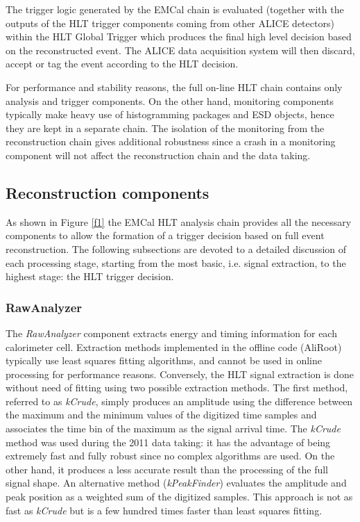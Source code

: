 The trigger logic generated by the EMCal chain is evaluated 
(together with the outputs of the HLT trigger components coming from other ALICE detectors)
within the HLT Global Trigger which produces the final high level decision based on the reconstructed event.
The ALICE data acquisition system will then discard, accept or tag the event according to the HLT decision.

For performance and stability reasons, the full on-line HLT chain contains only analysis 
and trigger components. On the other hand, monitoring components typically make 
heavy use of histogramming packages and ESD objects, hence they are kept in a separate chain.
The isolation of the monitoring from the reconstruction chain gives additional robustness since 
a crash in a monitoring component will not affect the reconstruction chain and the data taking.

\subsection{Reconstruction components}

As shown in Figure \ref{f1} the EMCal HLT analysis chain provides all the 
necessary components to allow the formation of a trigger
decision based on full event reconstruction. The following 
subsections are devoted to a detailed discussion of each processing 
stage, starting from the most basic, i.e. signal extraction, to 
the highest stage: the HLT trigger decision.

\subsubsection{RawAnalyzer}
The {\it RawAnalyzer} component extracts energy and timing information for each calorimeter cell. 
Extraction methods implemented in the offline code (AliRoot) typically 
use least squares fitting algorithms, and cannot be used in online processing for 
performance reasons. 
Conversely, the HLT signal extraction is done without need of fitting 
using two possible extraction methods. The first method, referred to as {\it kCrude},
simply produces an amplitude using the difference between the maximum and the minimum values
of the digitized time samples and associates the time bin of the maximum as the signal arrival time.
The {\it kCrude} method was used during the 2011 data taking: it has the advantage
of being extremely fast and fully robust since no complex algorithms are used. On the other hand,
it produces a less accurate result than the processing of the full signal shape.
An alternative method ({\it kPeakFinder}) evaluates the amplitude 
and peak position as a weighted sum of the digitized samples. This approach is
not as fast as {\it kCrude} but is a few hundred times faster than least squares fitting.

